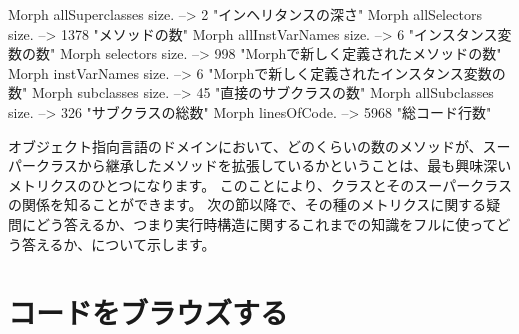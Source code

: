 \documentclass[a4paper,10pt,twoside]{book}
\begin{document}
\begin{code}{}
Morph allSuperclasses size.  -->       2 "インヘリタンスの深さ"
Morph allSelectors size.        --> 1378 "メソッドの数"
Morph allInstVarNames size. -->      6 "インスタンス変数の数"
Morph selectors size.             -->  998 "Morphで新しく定義されたメソッドの数"
Morph instVarNames size.     -->      6 "Morphで新しく定義されたインスタンス変数の数"
Morph subclasses size.          -->    45 "直接のサブクラスの数"
Morph allSubclasses size.      -->  326 "サブクラスの総数"
Morph linesOfCode.               --> 5968 "総コード行数"
\end{code}

オブジェクト指向言語のドメインにおいて、どのくらいの数のメソッドが、スーパークラスから継承したメソッドを拡張しているかということは、最も興味深いメトリクスのひとつになります。
このことにより、クラスとそのスーパークラスの関係を知ることができます。
次の節以降で、その種のメトリクスに関する疑問にどう答えるか、つまり実行時構造に関するこれまでの知識をフルに使ってどう答えるか、について示します。%

\section{コードをブラウズする}
\end{document}
